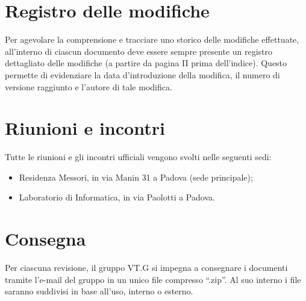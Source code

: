 \chapter{Registro delle modifiche}
\thispagestyle{fancy}
Per agevolare la comprensione e tracciare uno storico delle modifiche
effettuate, all'interno di ciascun documento deve essere sempre
presente un registro dettagliato delle modifiche (a partire da
pagina II prima dell'indice). Questo permette di evidenziare la data
d'introduzione della modifica, il numero di versione raggiunto e l'autore di tale modifica.


\chapter{Riunioni e incontri}
\thispagestyle{fancy}
Tutte le riunioni e gli incontri ufficiali vengono svolti nelle seguenti sedi:

\begin{itemize}
\item Residenza Messori, in via Manin 31 a Padova (sede principale);
\item Laboratorio di Informatica, in via Paolotti a Padova.
\end{itemize}


\chapter{Consegna}
\thispagestyle{fancy}
Per ciascuna revisione, il gruppo VT.G si impegna a consegnare i documenti
tramite l'e-mail del gruppo in un unico file compresso ``.zip''. Al suo interno i
file saranno suddivisi in base all'uso, interno o esterno.


